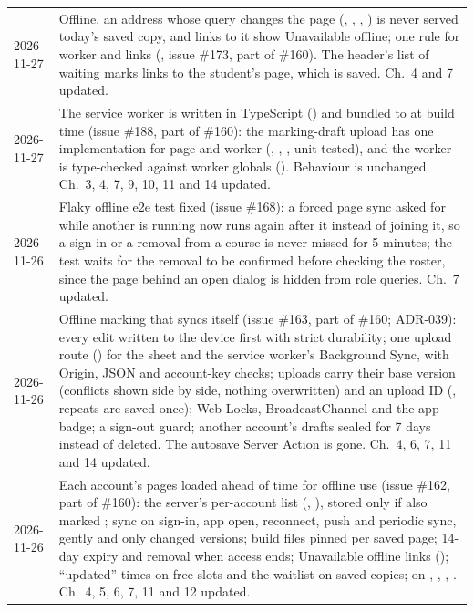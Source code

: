 \begin{xltabular}{\linewidth}{@{}l L@{}}
  2026-11-27 & Offline, an address whose query changes the page (, , , ) is never served today's saved copy, and links to it show Unavailable offline; one rule for worker and links (, issue \#173, part of \#160). The header's list of waiting marks links to the student's page, which is saved. Ch.~4 and 7 updated.\\
  2026-11-27 & The service worker is written in TypeScript () and bundled to  at build time (issue \#188, part of \#160): the marking-draft upload has one implementation for page and worker (, , , unit-tested), and the worker is type-checked against worker globals (). Behaviour is unchanged. Ch.~3, 4, 7, 9, 10, 11 and 14 updated.\\
  2026-11-26 & Flaky offline e2e test fixed (issue \#168): a forced page sync asked for while another is running now runs again after it instead of joining it, so a sign-in or a removal from a course is never missed for 5 minutes; the test waits for the removal to be confirmed before checking the roster, since the page behind an open dialog is hidden from role queries. Ch.~7 updated.\\
  2026-11-26 & Offline marking that syncs itself (issue \#163, part of \#160; ADR-039): every edit written to the device first with strict durability; one upload route () for the sheet and the service worker's Background Sync, with Origin, JSON and account-key checks; uploads carry their base version (conflicts shown side by side, nothing overwritten) and an upload ID (, repeats are saved once); Web Locks, BroadcastChannel and the app badge; a sign-out guard; another account's drafts sealed for 7 days instead of deleted. The autosave Server Action is gone. Ch.~4, 6, 7, 11 and 14 updated.\\
  2026-11-26 & Each account's pages loaded ahead of time for offline use (issue \#162, part of \#160): the server's per-account list (, ), stored only if also marked ; sync on sign-in, app open, reconnect, push and periodic sync, gently and only changed versions; build files pinned per saved page; 14-day expiry and removal when access ends; Unavailable offline links (); ``updated'' times on free slots and the waitlist on saved copies;  on , , , . Ch.~4, 5, 6, 7, 11 and 12 updated.\\

\end{xltabular}
